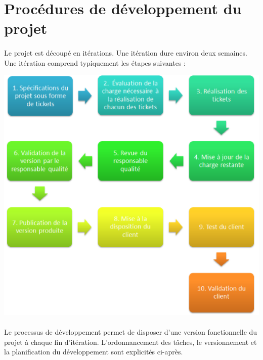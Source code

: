 \documentclass {report}
\begin{document}
\section{Procédures de développement du projet}
\paragraph{}
Le projet est découpé en itérations. Une itération dure environ deux semaines. Une itération comprend typiquement les étapes suivantes :

\begin{center}
\includegraphics[scale=0.5]{iteration.png}
\end{center}

\paragraph{}
Le processus de développement permet de disposer d’une version fonctionnelle du projet à chaque fin d’itération. L'ordonnancement des tâches, le versionnement et la planification du développement sont explicités ci-après.
\end{document}
